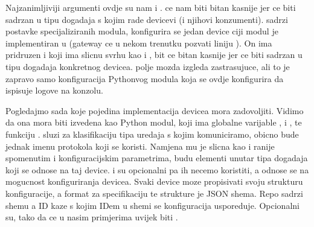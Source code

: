 \documentclass[letterpaper,10pt,croatian]{sphinxmanual}
\begin{document}
\sphinxAtStartPar
Najzanimljiviji argumenti ovdje su nam  i .
 ce nam biti bitan kasnije jer ce biti sadrzan u tipu dogadaja
s kojim rade devicevi (i njihovi konzumenti).  sadrzi postavke
specijaliziranih modula, konfigurira se jedan device ciji modul je
implementiran u  (gateway ce u nekom trenutku pozvati liniju
). On ima pridruzen i  koji ima slicnu svrhu
kao i , bit ce bitan kasnije jer ce biti sadrzan u tipu
dogadaja konkretnog devicea.  polje mozda izgleda zastrasujuce, ali to
je zapravo samo konfiguracija Pythonvog   modula koja se ovdje
konfigurira da ispisuje logove na konzolu.

\sphinxAtStartPar
Pogledajmo sada 
koje pojedina implementacija devicea mora zadovoljiti. Vidimo da ona mora biti
izvedena kao Python modul, koji ima globalne varijable ,
 i , te funkciju .
 sluzi za klasifikaciju tipa uredaja s kojim komuniciramo,
obicno bude jednak imenu protokola koji se koristi. Namjena mu je slicna kao i
ranije spomenutim  i  konfiguracijskim
parametrima, budu elementi unutar tipa dogadaja koji se odnose na taj device.
 i  su opcionalni pa ih necemo koristiti,
a odnose se na mogucnost konfiguriranja devicea. Svaki device moze propisivati
svoju strukturu konfiguracije, a format za specifikaciju te strukture je JSON
shema. Repo sadrzi shemu a ID kaze s kojim ID\sphinxhyphen{}em u shemi se konfiguracija
usporeduje. Opcionalni su, tako da ce u nasim primjerima uvijek biti .
\end{document}
